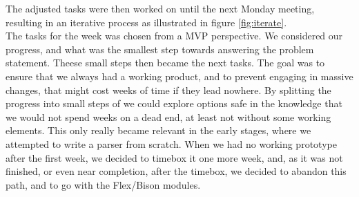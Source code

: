 The adjusted tasks were then worked on until the next Monday meeting, resulting in an iterative process as illustrated in figure \ref{fig:iterate}.\\

The tasks for the week was chosen from a MVP perspective. We considered our progress, and what was the smallest step towards answering the problem statement. Theese small steps then became the next tasks. The goal was to ensure that we always had a working product, and to prevent engaging in massive changes, that might cost weeks of time if they lead nowhere. By splitting the progress into small steps of we could explore options safe in the knowledge that we would not spend weeks on a dead end, at least not without some working elements. This only really became relevant in the early stages, where we attempted to write a parser from scratch. When we had no working prototype after the first week, we decided to timebox it one more week, and, as it was not finished, or even near completion, after the timebox, we decided to abandon this path, and to go with the Flex/Bison modules.

